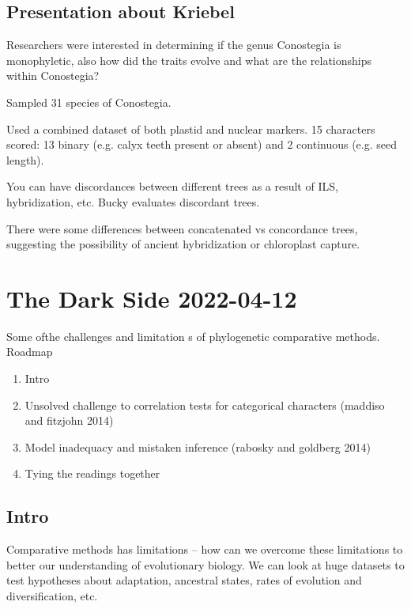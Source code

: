 \documentclass{article}
\begin{document}
\subsection{Presentation about Kriebel}

Researchers were interested in determining if the genus Conostegia is monophyletic, also how did the traits evolve and what are the relationships within Conostegia?

Sampled 31 species of Conostegia.

Used a combined dataset of both plastid and nuclear markers. 15 characters scored: 13 binary (e.g. calyx teeth present or absent) and 2 continuous (e.g. seed length). 

You can have discordances between different trees as a result of ILS, hybridization, etc. Bucky evaluates discordant trees.

There were some differences between concatenated vs concordance trees, suggesting the possibility of ancient hybridization or chloroplast capture.


\section{The Dark Side 2022-04-12}

Some ofthe challenges and limitation s of phylogenetic comparative methods.
Roadmap
\begin{enumerate}
\item Intro
\item Unsolved challenge to correlation tests for categorical characters
(maddiso and fitzjohn 2014)
\item Model inadequacy and mistaken inference (rabosky and goldberg 2014)
\item Tying the readings together
\end{enumerate}

\subsection{Intro}
Comparative methods has limitations -- how can we overcome these limitations to
better our understanding of evolutionary biology. We can look at huge datasets
to test hypotheses  about adaptation, ancestral states, rates of evolution and
diversification, etc.
\end{document}
